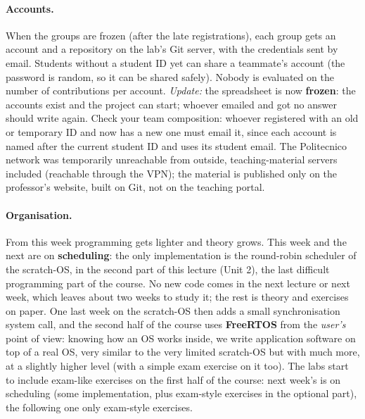 \paragraph{Accounts.} When the groups are frozen (after the late registrations), each group gets an account and a repository on the lab's Git server, with the credentials sent by email. Students without a student ID yet can share a teammate's account (the password is random, so it can be shared safely). Nobody is evaluated on the number of contributions per account. \emph{Update:} the spreadsheet is now \textbf{frozen}: the accounts exist and the project can start; whoever emailed and got no answer should write again. Check your team composition: whoever registered with an old or temporary ID and now has a new one must email it, since each account is named after the current student ID and uses its student email. The Politecnico network was temporarily unreachable from outside, teaching-material servers included (reachable through the VPN); the material is published only on the professor's website, built on Git, not on the teaching portal.

\paragraph{Organisation.} From this week programming gets lighter and theory grows. This week and the next are on \textbf{scheduling}: the only implementation is the round-robin scheduler of the scratch-OS, in the second part of this lecture (Unit 2), the last difficult programming part of the course. No new code comes in the next lecture or next week, which leaves about two weeks to study it; the rest is theory and exercises on paper. One last week on the scratch-OS then adds a small synchronisation system call, and the second half of the course uses \textbf{FreeRTOS} from the \emph{user's} point of view: knowing how an OS works inside, we write application software on top of a real OS, very similar to the very limited scratch-OS but with much more, at a slightly higher level (with a simple exam exercise on it too). The labs start to include exam-like exercises on the first half of the course: next week's is on scheduling (some implementation, plus exam-style exercises in the optional part), the following one only exam-style exercises.

